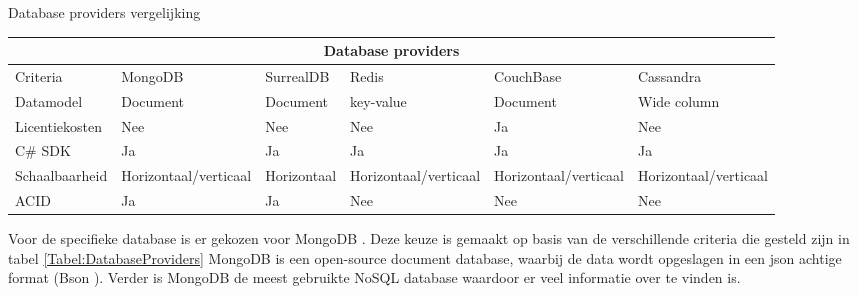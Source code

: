 \whitespace[2]
\begin{graphic}
	\captionsetup{type=table}
	\caption{Database providers vergelijking}
	\begin{tabular}{ |p{6.2em}||p{2.2cm}|p{2.2cm}|p{2.2cm}|p{2.2cm}|p{2.4cm}| }
		\hline
		\multicolumn{6}{|c|}{Database providers}                                                                                                             \\
		\hline
		Criteria       & MongoDB                     & SurrealDB   & Redis                       & CouchBase                   & Cassandra                   \\
		\hline
		Datamodel      & Document                    & Document    & key-value                   & Document                    & Wide column                 \\
		\hline
		Licentiekosten & Nee                         & Nee         & Nee                         & Ja                          & Nee                         \\
		\hline
		C\# SDK        & Ja                          & Ja          & Ja                          & Ja                          & Ja                          \\
		\hline
		Schaalbaarheid & Horizontaal\slash verticaal & Horizontaal & Horizontaal\slash verticaal & Horizontaal\slash verticaal & Horizontaal\slash verticaal \\
		\hline
		ACID           & Ja                          & Ja          & Nee                         & Nee                         & Nee                         \\
		\hline
	\end{tabular}
	\label{Tabel:DatabaseProviders}
\end{graphic}


\whitespace
Voor de specifieke database is er gekozen voor MongoDB \parencite{MongoDB}.
Deze keuze is gemaakt op basis van de verschillende criteria die gesteld zijn in tabel \ref{Tabel:DatabaseProviders}
MongoDB is een open-source document database, waarbij de data wordt opgeslagen in een json achtige format (Bson \parencite{Bson}).
Verder is MongoDB de meest gebruikte NoSQL database waardoor er veel informatie over te vinden is.
